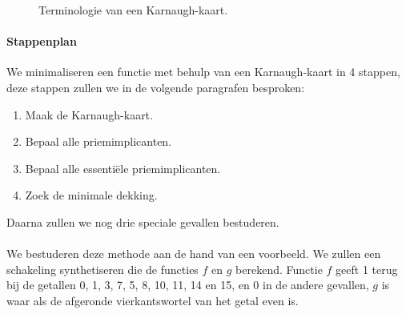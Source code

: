 \begin{figure}[hbt]
\caption{Terminologie van een Karnaugh-kaart.}
\label{fig:karnaughKaartTerminologie}
\end{figure}
\paragraph{Stappenplan}
We minimaliseren een functie met behulp van een Karnaugh-kaart in 4 stappen, deze stappen zullen we in de volgende paragrafen besproken:
\begin{enumerate}
 \item Maak de Karnaugh-kaart.
 \item Bepaal alle priemimplicanten.
 \item Bepaal alle essenti\"ele priemimplicanten.
 \item Zoek de minimale dekking.
\end{enumerate}
Daarna zullen we nog drie speciale gevallen bestuderen.
\paragraph{}
We bestuderen deze methode aan de hand van een voorbeeld. We zullen een schakeling synthetiseren die de functies $f$ en $g$ berekend. Functie $f$ geeft 1 terug bij de getallen 0, 1, 3, 7, 5, 8, 10, 11, 14 en 15, en 0 in de andere gevallen, $g$ is waar  als de afgeronde vierkantswortel van het getal even is.
